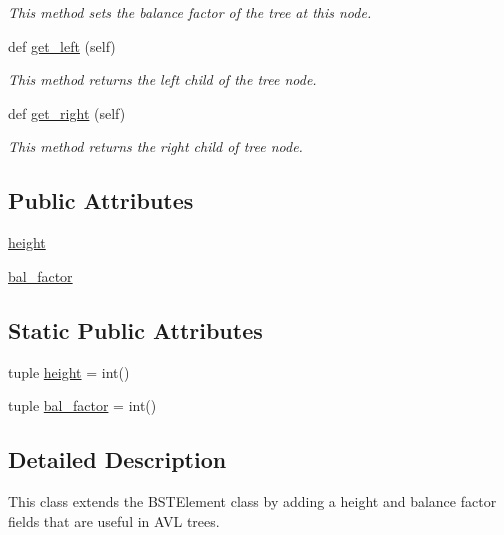 \begin{DoxyCompactItemize}
\begin{DoxyCompactList}\small\item\em This method sets the balance factor of the tree at this node. \end{DoxyCompactList}\item 
def \hyperlink{classbridges_1_1avl__tree__element_1_1_a_v_l_tree_element_af36a21b621dd4aab6cf7dd041058f9e7}{get\+\_\+left} (self)
\begin{DoxyCompactList}\small\item\em This method returns the left child of the tree node. \end{DoxyCompactList}\item 
def \hyperlink{classbridges_1_1avl__tree__element_1_1_a_v_l_tree_element_ac1be8fd466c3aa5d278c4ddc01d2019d}{get\+\_\+right} (self)
\begin{DoxyCompactList}\small\item\em This method returns the right child of tree node. \end{DoxyCompactList}\end{DoxyCompactItemize}
\subsection*{Public Attributes}
\begin{DoxyCompactItemize}
\item 
\hyperlink{classbridges_1_1avl__tree__element_1_1_a_v_l_tree_element_a83590431488989ab3143e69c5fc2deb3}{height}
\item 
\hyperlink{classbridges_1_1avl__tree__element_1_1_a_v_l_tree_element_a9bc19a93645da2c30d029315dcce1d09}{bal\+\_\+factor}
\end{DoxyCompactItemize}
\subsection*{Static Public Attributes}
\begin{DoxyCompactItemize}
\item 
tuple \hyperlink{classbridges_1_1avl__tree__element_1_1_a_v_l_tree_element_afbecc8cba2dc623cb6897767a1555b09}{height} = int()
\item 
tuple \hyperlink{classbridges_1_1avl__tree__element_1_1_a_v_l_tree_element_a3ef9e56931a3b3296138e51027d96ce1}{bal\+\_\+factor} = int()
\end{DoxyCompactItemize}


\subsection{Detailed Description}
This class extends the B\+S\+T\+Element class by adding a height and balance factor fields that are useful in A\+V\+L trees. 

